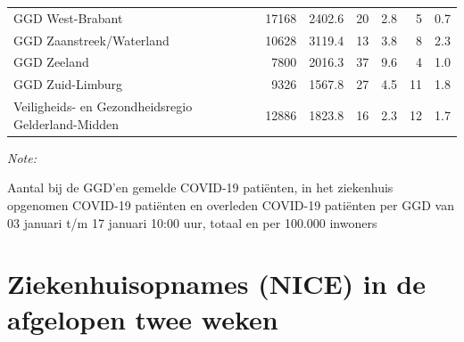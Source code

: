 \documentclass[
  english,
  man,floatsintext]{apa6}
\begin{document}
\begin{table}
\begin{threeparttable}
\begin{tabular}{lrrrrrr}
GGD West-Brabant & 17168 & 2402.6 & 20 & 2.8 & 5 & 0.7\\
GGD Zaanstreek/Waterland & 10628 & 3119.4 & 13 & 3.8 & 8 & 2.3\\
GGD Zeeland & 7800 & 2016.3 & 37 & 9.6 & 4 & 1.0\\
GGD Zuid-Limburg & 9326 & 1567.8 & 27 & 4.5 & 11 & 1.8\\
Veiligheids- en Gezondheidsregio Gelderland-Midden & 12886 & 1823.8 & 16 & 2.3 & 12 & 1.7\\
\bottomrule
\end{tabular}
\begin{tablenotes}
\item \textit{Note: } 
\item Aantal bij de GGD’en gemelde COVID-19 patiënten, in het ziekenhuis opgenomen COVID-19 patiënten en overleden COVID-19 patiënten per GGD van 03 januari t/m 17 januari 10:00 uur, totaal en per 100.000 inwoners
\end{tablenotes}
\end{threeparttable}
\endgroup{}
\end{table}

\newpage

\hypertarget{ziekenhuisopnames-nice-in-de-afgelopen-twee-weken}{%
\section{Ziekenhuisopnames (NICE) in de afgelopen twee weken}\label{ziekenhuisopnames-nice-in-de-afgelopen-twee-weken}}
\end{document}
